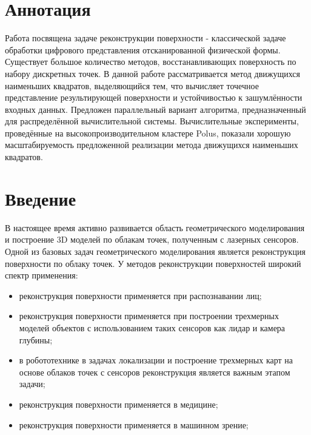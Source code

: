 \section*{Аннотация}
Работа посвящена задаче реконструкции поверхности - классической задаче
обработки цифрового представления отсканированной физической формы. 
Существует большое количество методов, восстанавливающих поверхность 
по набору дискретных точек. В данной работе рассматривается метод движущихся 
наименьших квадратов, выделяющийся тем, что вычисляет точечное представление 
результирующей поверхности и устойчивостью к зашумлённости входных данных. 
Предложен параллельный вариант алгоритма, предназначенный для распределённой вычислительной 
системы. Вычислительные эксперименты, проведённые на высокопроизводительном кластере Polus, показали
хорошую масштабируемость предложенной реализации метода движущихся 
наименьших квадратов.
\clearpage

\section*{Введение} 
В настоящее время активно развивается область геометрического моделирования и построение 3D моделей по облакам точек, полученным с лазерных сенсоров. Одной из базовых задач геометрического моделирования является реконструкция поверхности по облаку точек. У методов реконструкции поверхностей широкий спектр применения: 
\begin{itemize}
    \item реконструкция поверхности применяется при распознавании лиц;
    \item реконструкция поверхности применяется при построении трехмерных моделей объектов с использованием таких сенсоров как лидар и камера глубины;
    \item в робототехнике в задачах локализации и построение трехмерных карт на основе облаков точек с сенсоров реконструкция является важным этапом задачи;
    \item реконструкция поверхности применяется в медицине;
    \item реконструкция поверхности применяется в машинном зрение;
\end{itemize}


